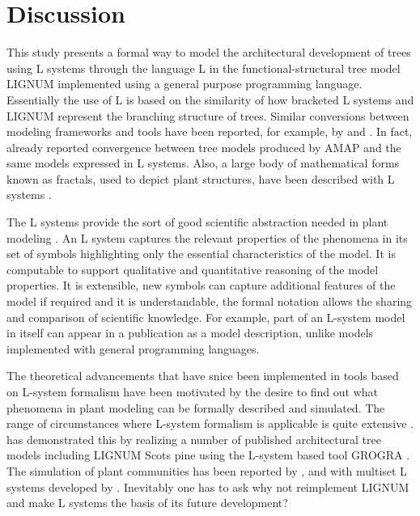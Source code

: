 \section{Discussion}

This  study   presents  a  formal  way  to   model  the  architectural
development of  trees using  L systems through  the language L  in the
functional-structural  tree model LIGNUM  implemented using  a general
purpose programming  language.  Essentially the  use of L is  based on
the similarity  of how  bracketed L systems  and LIGNUM  represent the
branching  structure of trees.   Similar conversions  between modeling
frameworks   and   tools  have   been   reported,   for  example,   by
\citet{ferraro:02}   and   \citet{dzierzon:03}.    In  fact,   already
\citet{kurth:em94} reported  convergence between tree  models produced
by AMAP  and the same  models expressed in  L systems.  Also,  a large
body of  mathematical forms  known as fractals,  used to  depict plant
structures, have been described with L systems \citep{kurth:99}.

The L systems  provide the sort of good  scientific abstraction needed
in plant modeling \citep[c.f.][]{regev:02}.   An L system captures the
relevant  properties   of  the  phenomena   in  its  set   of  symbols
highlighting only  the essential characteristics of the  model.  It is
computable to  support qualitative  and quantitative reasoning  of the
model  properties.    It  is  extensible,  new   symbols  can  capture
additional features of the model if required and it is understandable,
the formal  notation allows the  sharing and comparison  of scientific
knowledge.   For example,  part of  an  L-system model  in itself  can
appear  in  a  publication  as  a  model  description,  unlike  models
implemented with general programming languages.

The theoretical advancements that have snice been implemented in tools
based on L-system formalism have  been motivated by the desire to find
out what  phenomena in  plant modeling can  be formally  described and
simulated.   The range  of circumstances  where L-system  formalism is
applicable  is quite  extensive  \citep{pp:99}.  \citet{kurth:99}  has
demonstrated  this by  realizing a  number of  published architectural
tree models including LIGNUM Scots pine \citep{perttunen:96} using the
L-system based  tool GROGRA \citep{kurth:94}. The  simulation of plant
communities has been  reported by \citet{deussen:98}, \citet{kurth:99}
and with multiset L  systems developed by \citet{lane:02}.  Inevitably
one has to ask why not reimplement LIGNUM and make L systems the basis
of its future development?

